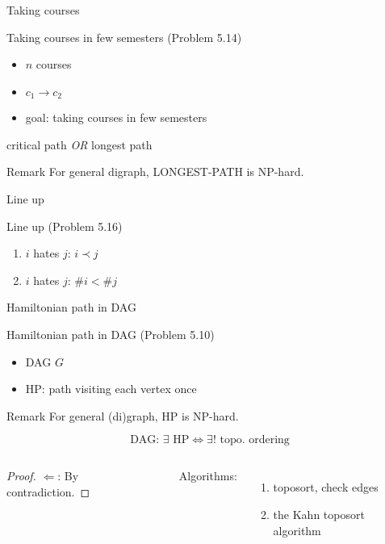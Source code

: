 \begin{frame}{Taking courses}
  \begin{exampleblock}{Taking courses in few semesters (Problem 5.14)}
	\begin{itemize}
	  \item $n$ courses
	  \item $c_1 \to c_2$
	  \item goal: taking courses in few semesters
	\end{itemize}
  \end{exampleblock}

  \pause
  \begin{center}
	critical path \emph{OR} longest path
  \end{center}

  \pause
  \begin{alertblock}{Remark}
	For general digraph, LONGEST-PATH is NP-hard.
  \end{alertblock}
\end{frame}
\begin{frame}{Line up}
  \begin{exampleblock}{Line up (Problem 5.16)}
    \begin{enumerate}
      \item $i$ hates $j$: $i \prec j$
      \item $i$ hates $j$: $\# i < \# j$
    \end{enumerate}
  \end{exampleblock}
\end{frame}
\begin{frame}{Hamiltonian path in DAG}
  \begin{exampleblock}{Hamiltonian path in DAG (Problem 5.10)}
    \begin{itemize}
      \item DAG $G$
      \item HP: path visiting each vertex once
    \end{itemize}
  \end{exampleblock}

  \pause
  \begin{alertblock}{Remark}
    For general (di)graph, HP is NP-hard.
  \end{alertblock}

  \pause
  \[
	\text{DAG: } \exists \text{ HP} \iff \exists! \text{ topo. ordering}
  \]

  \begin{columns}
	  \pause
	  \begin{proof}
		$\Longleftarrow$: By contradiction. 
	  \end{proof}
	  \pause
	  Algorithms:
	  \begin{enumerate}
		\item toposort, check edges
		\item the Kahn toposort algorithm
	  \end{enumerate}
	\end{columns}
\end{frame}
